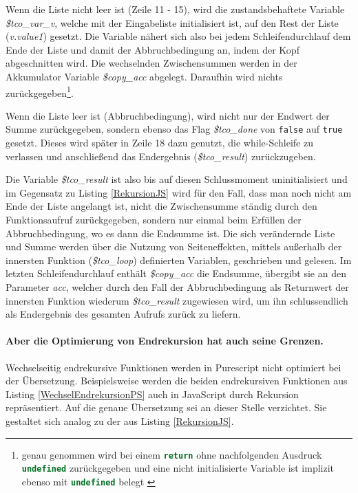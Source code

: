 \documentclass[
12pt,
ngerman,
oneside]
{scrbook} %
\begin{document}
Wenn die Liste nicht leer ist (Zeile 11 - 15), wird die zustandsbehaftete Variable \emph{\$tco_var_v}, welche mit der Eingabeliste initialisiert ist, auf den Rest der Liste (\emph{v.value1}) gesetzt. Die Variable nähert sich also bei jedem Schleifendurchlauf dem Ende der Liste und damit der Abbruchbedingung an, indem der Kopf \glqq abgeschnitten\grqq{} wird. Die wechselnden Zwischensummen werden in der Akkumulator Variable \emph{\$copy_acc} abgelegt. Daraufhin wird nichts zurückgegeben\footnote{\label{initUndefined}genau genommen wird bei einem \lstinline[language=javascript, columns=fixed]{return} ohne nachfolgenden Ausdruck \lstinline[language=javascript, columns=fixed]{undefined} zurückgegeben und eine nicht initialisierte Variable ist implizit ebenso mit \lstinline[language=javascript, columns=fixed]{undefined} belegt \cites{w3schoolsJSReturnStatement18}{w3schoolsJSUndefined18}}.

Wenn die Liste leer ist (Abbruchbedingung), wird nicht nur der Endwert der Summe zurückgegeben, sondern ebenso das Flag \emph{\$tco_done} von \lstinline[language=purescript, columns=fixed]{false} auf \lstinline[language=purescript, columns=fixed]{true} gesetzt. Dieses wird später in Zeile 18 dazu genutzt, die while-Schleife zu verlassen und anschließend das Endergebnis (\emph{\$tco_result}) zurückzugeben.

Die Variable \emph{\$tco_result} ist also bis auf diesen Schlussmoment uninitialisiert und im Gegensatz zu Listing \ref{RekursionJS} wird für den Fall, dass man noch nicht am Ende der Liste angelangt ist, nicht die Zwischensumme ständig durch den Funktionsaufruf zurückgegeben, sondern nur einmal beim Erfüllen der Abbruchbedingung, wo es dann die Endsumme ist. Die sich verändernde Liste und Summe werden über die Nutzung von Seiteneffekten, mittels außerhalb der innersten Funktion (\emph{\$tco_loop}) definierten Variablen, geschrieben und gelesen. Im letzten Schleifendurchlauf enthält \emph{\$copy_acc} die Endsumme, übergibt sie an den Parameter \emph{acc}, welcher durch den Fall der Abbruchbedingung als Returnwert der innersten Funktion wiederum \emph{\$tco_result} zugewiesen wird, um ihn schlussendlich als Endergebnis des gesamten Aufrufs zurück zu liefern.

\paragraph{Aber die Optimierung von Endrekursion hat auch seine Grenzen.}   Wechselseitig endrekursive Funktionen werden in Purescript nicht optimiert bei der Übersetzung. Beispielsweise werden die beiden endrekursiven Funktionen aus Listing \ref{WechselEndrekursionPS} auch in JavaScript durch Rekursion repräsentiert. Auf die genaue Übersetzung sei an dieser Stelle verzichtet. Sie gestaltet sich analog zu der aus Listing \ref{RekursionJS}.
\end{document}
